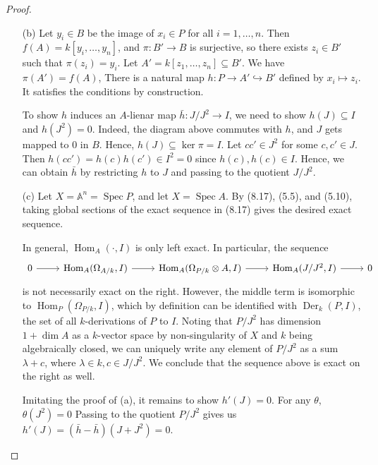 \documentclass{article}
\newcommand{\A}{\mathbb{A}}
\DeclareMathOperator{\Hom}{Hom}
\DeclareMathOperator{\Der}{Der}
\DeclareMathOperator{\spec}{Spec}
\begin{document}
\begin{enumerate} [label=\textbf{\arabic*.}, leftmargin=0em]
\begin{proof}
\begin{itemize} [leftmargin=0cm]
\item[(b)] Let $y_i \in B$ be the image of $x_i \in P$ for all $i = 1, \dots, n$. Then $f(A) = k[y_i, \dots, y_n]$, and $\pi : B' \to B$ is surjective, so there exists $z_i \in B'$ such that $\pi(z_i) = y_i$. Let $A' = k[z_1, \dots, z_n] \subseteq B'$. We have $\pi(A') = f(A)$, There is a natural map $h : P \to A' \hookrightarrow B'$ defined by $x_i \mapsto z_i$. It satisfies the conditions by construction.

To show $h$ induces an $A$-lienar map $\bar{h} : J/J^2 \to I$, we need to show $h(J) \subseteq I$ and $h(J^2) = 0$. Indeed, the diagram above commutes with $h$, and $J$ gets mapped to $0$ in $B$. Hence, $h(J) \subseteq \ker{\pi} = I$. Let $cc' \in J^2$ for some $c, c' \in J$. Then $h(cc') = h(c)h(c') \in I^2 = 0$ since $h(c), h(c) \in I$. Hence, we can obtain $\bar{h}$ by restricting $h$ to $J$ and passing to the quotient $J/J^2$.

\item[(c)] Let $X = \A^n = \spec{P}$, and let $X = \spec{A}$. By (8.17), (5.5), and (5.10), taking global sections of the exact sequence in (8.17) gives the desired exact sequence.

In general, $\Hom_A(\cdot, I)$ is only left exact. In particular, the sequence
\[ \begin{tikzcd}
    0 \arrow[r] & {\Hom_A(\Omega_{A/k},I)} \arrow[r] & {\Hom_A(\Omega_{P/k} \otimes A,I)} \arrow[r] & {\Hom_A(J/J^2,I)} \arrow[r] & 0
    \end{tikzcd} \]
is not necessarily exact on the right. However, the middle term is isomorphic to $\Hom_P(\Omega_{P/k}, I)$, which by definition can be identified with $\Der_k(P, I)$, the set of all $k$-derivations of $P$ to $I$. Noting that $P/J^2$ has dimension $1 + \dim{A}$ as a $k$-vector space by non-singularity of $X$ and $k$ being algebraically closed, we can uniquely write any element of $P/J^2$ as a sum $\lambda + c$, where $\lambda \in k, c \in J/J^2$. We conclude that the sequence above is exact on the right as well.

Imitating the proof of (a), it remains to show $h'(J) = 0$. For any $\theta$, $\theta(J^2) = 0$ Passing to the quotient $P/J^2$ gives us $h'(J) = (\bar{h} - \bar{h})(J + J^2) = 0$.
\end{itemize} 
\end{proof}

\end{enumerate}
\end{document}
